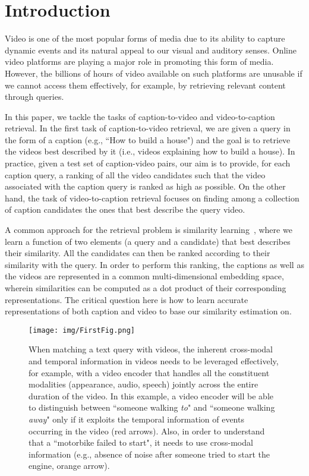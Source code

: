 \documentclass[runningheads]{llncs}
\begin{document}
\section{Introduction}
Video is one of the most popular forms of media due to its ability to capture dynamic events and its natural appeal to our visual and auditory senses. Online video platforms are playing a major role in promoting this form of media. However, the billions of hours of video available on such platforms are unusable if we cannot access them effectively, for example, by retrieving relevant content through queries.

In this paper, we tackle the tasks of caption-to-video and video-to-caption retrieval. In the first task of caption-to-video retrieval, we are given a query in the form of a caption (e.g., ``How to build a house") and the goal is to retrieve the videos best described by it (i.e., videos explaining how to build a house). In practice, given a test set of caption-video pairs, our aim is to provide, for each caption query, a ranking of all the video candidates such that the video associated with the caption query is ranked as high as possible.
On the other hand, the task of video-to-caption retrieval focuses on finding among a collection of caption candidates the ones that best describe the query video.

A common approach for the retrieval problem is similarity learning~\cite{Xing2003distancemetric}, where we learn a function of two elements (a query and a candidate) that best describes their similarity. All the candidates can then be ranked according to their similarity with the query. In order to perform this ranking, the captions as well as the videos are represented in a common multi-dimensional embedding space, wherein similarities can be computed as a dot product of their corresponding representations. The critical question here is how to learn accurate representations of both caption and video to base our similarity estimation on.

\begin{figure*}[t]
\begin{center}
\texttt{[image: img/FirstFig.png]}
\end{center}
   \caption{When matching a text query with videos, the inherent cross-modal and temporal information in videos needs to be leveraged effectively, for example, with a video encoder that handles all the constituent modalities (appearance, audio, speech) jointly across the entire duration of the video. In this example, a video encoder will be able to distinguish between ``someone walking \textit{to}" and ``someone walking \textit{away}" only if it exploits the temporal information of events occurring in the video (red arrows). Also, in order to understand that a ``motorbike failed to start", it needs to use cross-modal information (e.g., absence of noise after someone tried to start the engine, orange arrow).}
\label{fig:video_signal}
\end{figure*}
\end{document}
